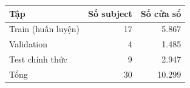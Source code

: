 \begin{tabular}{lrr}
\toprule
Tập & Số subject & Số cửa sổ \\
\midrule
Train (huấn luyện) & 17 & 5.867 \\
Validation & 4 & 1.485 \\
Test chính thức & 9 & 2.947 \\
\midrule
Tổng & 30 & 10.299 \\
\bottomrule
\end{tabular}
